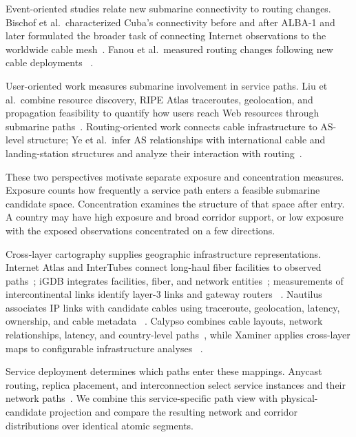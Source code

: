 Event-oriented studies relate new submarine connectivity to routing changes.
Bischof et al.\ characterized Cuba's connectivity before and after ALBA-1 and
later formulated the broader task of connecting Internet observations to the
worldwide cable mesh~\cite{bischof2015cuba,bischof2018untangling}. Fanou et al.\
measured routing changes following new cable deployments
~\cite{fanou2020unintended}.

User-oriented work measures submarine involvement in service paths. Liu et
al.\ combine resource discovery, RIPE Atlas traceroutes, geolocation, and
propagation feasibility to quantify how users reach Web resources through
submarine paths~\cite{liu2020outofsight}. Routing-oriented work connects cable
infrastructure to AS-level structure; Ye et al.\ infer AS relationships with
international cable and landing-station structures and analyze their
interaction with routing~\cite{ye2023impact}.

These two perspectives motivate separate exposure and concentration measures.
Exposure counts how frequently a service path enters a feasible submarine
candidate space. Concentration examines the structure of that space after
entry. A country may have high exposure and broad corridor support, or low
exposure with the exposed observations concentrated on a few directions.

Cross-layer cartography supplies geographic infrastructure representations.
Internet Atlas and InterTubes connect long-haul fiber facilities to observed
paths~\cite{durairajan2013atlas,durairajan2015intertubes}; iGDB integrates
facilities, fiber, and network entities~\cite{anderson2022igdb}; measurements of
intercontinental links identify layer-3 links and gateway routers
~\cite{carisimo2023hopaway}. Nautilus associates IP links with candidate cables
using traceroute, geolocation, latency, ownership, and cable metadata
~\cite{ramanathan2023nautilus}. Calypso combines cable layouts, network
relationships, latency, and country-level paths~\cite{wang2025calypso}, while
Xaminer applies cross-layer maps to configurable infrastructure analyses
~\cite{ramanathan2024xaminer}.

Service deployment determines which paths enter these mappings. Anycast routing,
replica placement, and interconnection select service instances and their
network paths~\cite{cicalese2015anycast,devries2017anycast}. We combine this
service-specific path view with physical-candidate projection and compare the
resulting network and corridor distributions over identical atomic segments.

